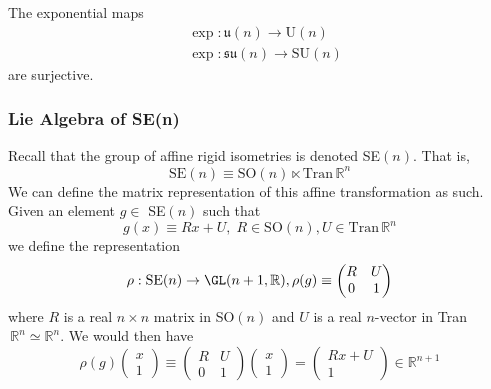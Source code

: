   \begin{theorem}
    \label{thm:surjectivity-of-exp-for-the-unitary-groups}
  The exponential maps 
  \begin{align*}
    & \exp: \mathfrak{u}(n) \rightarrow \text{U}(n) \\
    & \exp: \mathfrak{su}(n) \rightarrow \text{SU}(n)
  \end{align*}
  are surjective. 
  \end{theorem}

\subsubsection{Lie Algebra of SE(n)}

  Recall that the group of affine rigid isometries is denoted SE$(n)$. That is, 
  \begin{equation}
    \text{SE}(n) \equiv \text{SO}(n) \ltimes \text{Tran}\,\mathbb{R}^n
  \end{equation}
  We can define the matrix representation of this affine transformation as such. Given an element $g \in$ SE$(n)$ such that
  \begin{equation}
    g(x) \equiv R x + U, \; R \in \text{SO}(n), U \in \text{Tran}\, \mathbb{R}^n 
  \end{equation}
  we define the representation
  \begin{equation}
    \rho: \text{SE}(n) \rightarrow \GL(n+1, \mathbb{R}), \rho(g) \equiv \begin{pmatrix}
    R&U\\0&1
    \end{pmatrix}
  \end{equation}
  where $R$ is a real $n\times n$ matrix in SO$(n)$ and $U$ is a real $n$-vector in Tran$\,\mathbb{R}^n \simeq \mathbb{R}^n$. We would then have
  \begin{equation}
    \rho(g) \begin{pmatrix}
    x\\1
    \end{pmatrix} \equiv \begin{pmatrix}
    R&U\\0&1
    \end{pmatrix} \begin{pmatrix}
    x\\1
    \end{pmatrix} = \begin{pmatrix}
    R x + U\\1
    \end{pmatrix} \in \mathbb{R}^{n+1}
  \end{equation}

